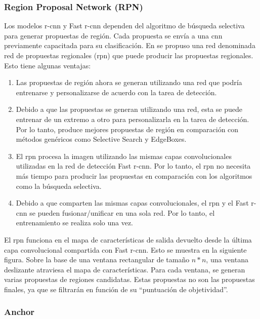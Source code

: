 \subsubsection*{Region Proposal Network (RPN)}
\label{subsubsec:region-proposal-network}

Los modelos \gls{r-cnn} y Fast \gls{r-cnn} dependen del algoritmo de búsqueda selectiva para generar propuestas de región. Cada propuesta se envía a una \gls{cnn} previamente capacitada para su clasificación. En \cite{ren2016faster} se propuso una red denominada red de propuestas regionales (\gls{rpn}) que puede producir las propuestas regionales. Esto tiene algunas ventajas:

\begin{enumerate}
    \item Las propuestas de región ahora se generan utilizando una red que podría entrenarse y personalizarse de acuerdo con la tarea de detección.
    \item Debido a que las propuestas se generan utilizando una red, esta se puede entrenar de un extremo a otro para personalizarla en la tarea de detección. Por lo tanto, produce mejores propuestas de región en comparación con métodos genéricos como Selective Search y EdgeBoxes.
    \item El \gls{rpn} procesa la imagen utilizando las mismas capas convolucionales utilizadas en la red de detección Fast \gls{r-cnn}. Por lo tanto, el \gls{rpn} no necesita más tiempo para producir las propuestas en comparación con los algoritmos como la búsqueda selectiva.
    \item Debido a que comparten las mismas capas convolucionales, el \gls{rpn} y el Fast \gls{r-cnn} se pueden fusionar/unificar en una sola red. Por lo tanto, el entrenamiento se realiza solo una vez.
\end{enumerate}

El \gls{rpn} funciona en el mapa de características de salida devuelto desde la última capa convolucional compartida con Fast \gls{r-cnn}. Esto se muestra en la siguiente figura. Sobre la base de una ventana rectangular de tamaño $n*n$, una ventana deslizante atraviesa el mapa de características. Para cada ventana, se generan varias propuestas de regiones candidatas. Estas propuestas no son las propuestas finales, ya que se filtrarán en función de su ``puntuación de objetividad''.

\subsubsection*{Anchor}
\label{subsubsec:anchor-faster-rcnn}

